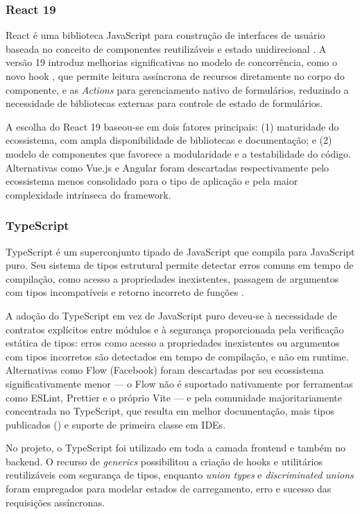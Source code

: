 \subsubsection{React 19}
React é uma biblioteca JavaScript para construção de interfaces de usuário baseada no conceito de componentes reutilizáveis e estado unidirecional \cite{benkora2024}. A versão 19 introduz melhorias significativas no modelo de concorrência, como o novo hook , que permite leitura assíncrona de recursos diretamente no corpo do componente, e as \textit{Actions} para gerenciamento nativo de formulários, reduzindo a necessidade de bibliotecas externas para controle de estado de formulários.

A escolha do React 19 baseou-se em dois fatores principais: (1) maturidade do ecossistema, com ampla disponibilidade de bibliotecas e documentação; e (2) modelo de componentes que favorece a modularidade e a testabilidade do código. Alternativas como Vue.js e Angular foram descartadas respectivamente pelo ecossistema menos consolidado para o tipo de aplicação e pela maior complexidade intrínseca do framework.

\subsubsection{TypeScript}
TypeScript é um superconjunto tipado de JavaScript que compila para JavaScript puro. Seu sistema de tipos estrutural permite detectar erros comuns em tempo de compilação, como acesso a propriedades inexistentes, passagem de argumentos com tipos incompatíveis e retorno incorreto de funções \cite{typescript2025}.

A adoção do TypeScript em vez de JavaScript puro deveu-se à necessidade de contratos explícitos entre módulos e à segurança proporcionada pela verificação estática de tipos: erros como acesso a propriedades inexistentes ou argumentos com tipos incorretos são detectados em tempo de compilação, e não em runtime. Alternativas como Flow (Facebook) foram descartadas por seu ecossistema significativamente menor — o Flow não é suportado nativamente por ferramentas como ESLint, Prettier e o próprio Vite — e pela comunidade majoritariamente concentrada no TypeScript, que resulta em melhor documentação, mais tipos publicados () e suporte de primeira classe em IDEs.

No projeto, o TypeScript foi utilizado em toda a camada frontend e também no backend. O recurso de \textit{generics} possibilitou a criação de hooks e utilitários reutilizáveis com segurança de tipos, enquanto \textit{union types} e \textit{discriminated unions} foram empregados para modelar estados de carregamento, erro e sucesso das requisições assíncronas.

